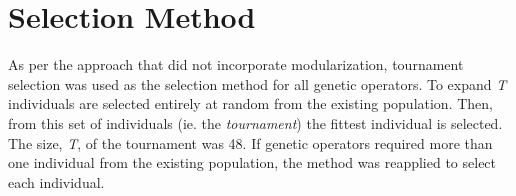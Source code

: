 \section{Selection Method}
As per the approach that did not incorporate modularization, tournament selection \cite{miller1995genetic} was used as the selection method for all genetic operators. To expand \emph{T} individuals are selected entirely at random from the existing population. Then, from this set of individuals (ie. the \emph{tournament}) the fittest individual is selected. The size, \emph{T}, of the tournament was 48. If genetic operators required more than one individual from the existing population, the method was reapplied to select each individual.